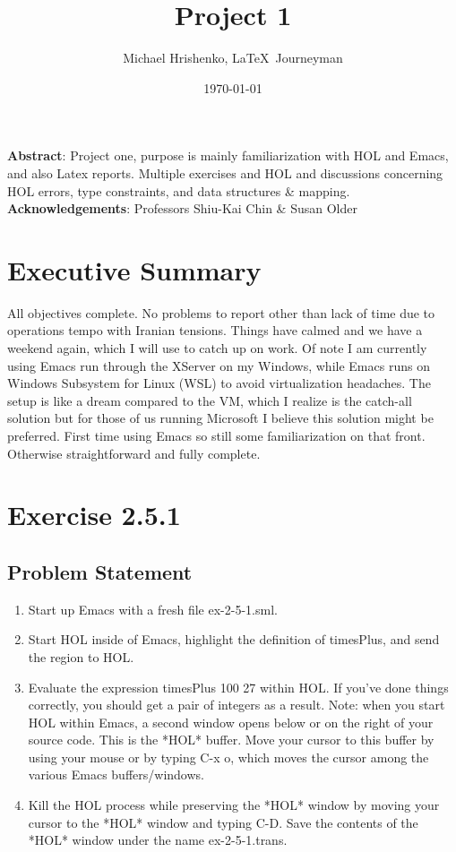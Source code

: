 \documentclass[oneside]{book}
\title{Project 1}
\date{\today}
\author{Michael Hrishenko, \LaTeX\ Journeyman}
\begin{document}
\maketitle
\textbf{Abstract}: Project one, purpose is mainly familiarization with HOL and Emacs, and also Latex reports. Multiple exercises and HOL and discussions concerning HOL errors, type constraints, and data structures \& mapping.
\newline
\\\textbf{Acknowledgements}: Professors Shiu-Kai Chin \& Susan Older
\tableofcontents

\chapter{Executive Summary}
All objectives complete. No problems to report other than lack of time due to operations tempo with Iranian tensions. Things have calmed and we have a weekend again, which I will use to catch up on work. Of note I am currently using Emacs run through the XServer on my Windows, while Emacs runs on Windows Subsystem for Linux (WSL) to avoid virtualization headaches. The setup is like a dream compared to the VM, which I realize is the catch-all solution but for those of us running Microsoft I believe this solution might be preferred. First time using Emacs so still some familiarization on that front. Otherwise straightforward and fully complete.

\chapter{Exercise 2.5.1}
\section{Problem Statement}
\begin{enumerate}
    \item Start up Emacs with a fresh file ex-2-5-1.sml.
    \item Start HOL inside of Emacs, highlight the definition of timesPlus, and send the region to HOL.
    \item Evaluate the expression timesPlus 100 27 within HOL. If you’ve done things correctly, you should get a pair of integers as a result. Note: when you start HOL within Emacs, a second window opens below or on the right of your source code. This is the *HOL* buffer. Move your cursor to this buffer by using your mouse or by typing C-x o, which moves the cursor among the various Emacs buffers/windows.
    \item Kill the HOL process while preserving the *HOL* window by moving your cursor to the *HOL* window and typing C-D. Save the contents of the *HOL* window under the name ex-2-5-1.trans.
\end{enumerate}
\end{document}
